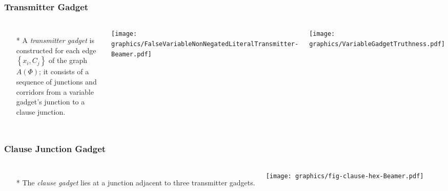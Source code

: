 \documentclass{beamer}
\begin{document}
\begin{frame} \frametitle{Transmitter Gadget}
    \begin{columns}[c]
        \begin{itemize}
            \item[*] A {\it transmitter gadget} is constructed for each edge $\left\lbrace x_i,C_j\right\rbrace$ of the graph $A(\Phi)$; it consists of a sequence of junctions and corridors from a variable gadget's junction to a clause junction.  
        \end{itemize}
        \begin{minipage}{\linewidth}
            \begin{center}
            \texttt{[image: graphics/FalseVariableNonNegatedLiteralTransmitter-Beamer.pdf]}
            \end{center}
        \end{minipage}

        \begin{minipage}{\linewidth}
            \begin{center}
            \texttt{[image: graphics/VariableGadgetTruthness.pdf]}
        \end{center}
        \end{minipage}
    \end{columns}
\end{frame}



\begin{frame} \frametitle{Clause Junction Gadget}
    \begin{columns}[c]
        \begin{itemize}
            \item[*] The {\it clause gadget} lies at a junction adjacent to three transmitter gadgets.
        \end{itemize}
        \begin{minipage}{\linewidth}
            \begin{center}
            \texttt{[image: graphics/fig-clause-hex-Beamer.pdf]}\label{gfx:fig-clause-hex-Beamer.pdf}
            \end{center}
        \end{minipage}
    \end{columns}
\end{frame}
\end{document}
